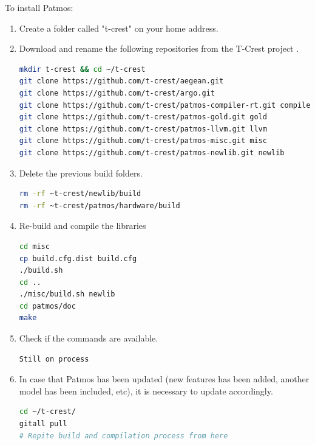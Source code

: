 To install Patmos:
\begin{enumerate}
	\item Create a folder called "t-crest" on your home address.
	\item Download and rename the following repositories from the T-Crest project \cite{bib:tcrest_repo}.

\lstset{style=Bstyle}
\begin{lstlisting}[language=bash]
mkdir t-crest && cd ~/t-crest
git clone https://github.com/t-crest/aegean.git
git clone https://github.com/t-crest/argo.git 
git clone https://github.com/t-crest/patmos-compiler-rt.git compiler-rt
git clone https://github.com/t-crest/patmos-gold.git gold
git clone https://github.com/t-crest/patmos-llvm.git llvm
git clone https://github.com/t-crest/patmos-misc.git misc
git clone https://github.com/t-crest/patmos-newlib.git newlib
\end{lstlisting}

	\item Delete the previous build folders.

\begin{lstlisting}[language=bash]
rm -rf ~t-crest/newlib/build
rm -rf ~t-crest/patmos/hardware/build
\end{lstlisting}

	\item Re-build and compile the libraries

\begin{lstlisting}[language=bash]
cd misc
cp build.cfg.dist build.cfg
./build.sh
cd ..
./misc/build.sh newlib
cd patmos/doc
make
\end{lstlisting}
	
	\item Check if the commands are available.
\begin{lstlisting}[language=bash]
Still on process
\end{lstlisting}

    \item In case that Patmos has been updated (new features has been added, another model has been included, etc), it is necessary to update accordingly.
    
\begin{lstlisting}[language=bash]
cd ~/t-crest/
gitall pull
# Repite build and compilation process from here
\end{lstlisting}    

\end{enumerate}

